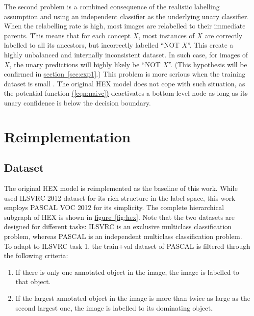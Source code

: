 \documentclass[11pt,a4paper]{article}
\begin{document}
The second problem is a combined consequence of the realistic labelling assumption and using an independent classifier as the underlying unary classifier. When the relabelling rate is high, most images are relabelled to their immediate parents. This means that for each concept $X$, most instances of $X$ are correctly labelled to all its ancestors, but incorrectly labelled ``NOT $X$''. This create a highly unbalanced and internally inconsistent dataset. In such case, for images of $X$, the unary predictions will highly likely be ``NOT $X$''. (This hypothesis will be confirmed in \hyperref[sec:exp1]{section~\ref{sec:exp1}}.) This problem is more serious when the training dataset is small \cite{he2009learning}. The original HEX model does not cope with such situation, as the potential function \hyperref[eqn:naive]{(\ref{eqn:naive})} deactivates a bottom-level node as long as its unary confidence is below the decision boundary.

\clearpage
\section{Reimplementation}
\subsection{Dataset}
\label{sec:data}

The original HEX model is reimplemented as the baseline of this work. While \cite{deng2014large} used ILSVRC 2012 dataset for its rich structure in the label space, this work employs PASCAL VOC 2012 \cite{pascal-voc-2012} for its simplicity. The complete hierarchical subgraph of HEX is shown in \hyperref[fig:hex]{figure~\ref{fig:hex}}. Note that the two datasets are designed for different tasks: ILSVRC is an exclusive multiclass classification problem, whereas PASCAL is an independent multiclass classification problem. To adapt to ILSVRC task 1, the train+val dataset of PASCAL is filtered through the following criteria:
\begin{enumerate}
\item If there is only one annotated object in the image, the image is labelled to that object.
\item If the largest annotated object in the image is more than twice as large as the second largest one, the image is labelled to its dominating object.
\end{enumerate}
\end{document}
